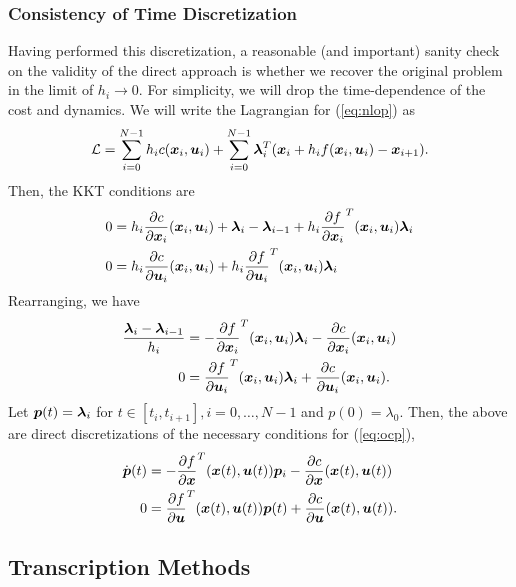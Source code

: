 \subsubsection{Consistency of Time Discretization}

Having performed this discretization, a reasonable (and important) sanity check on the validity of the direct approach is whether we recover the original problem in the limit of $h_i \to 0$. For simplicity, we will drop the time-dependence of the cost and dynamics. We will write the Lagrangian for (\ref{eq:nlop}) as 
\begin{equation}
    \mathcal{L} = \sum_{i=0}^{N-1} h_i c(\bm{x}_i,\bm{u}_i) + \sum_{i=0}^{N-1} \bm{\lambda}_i^T (\bm{x}_i + h_i f(\bm{x}_i,\bm{u}_i) - \bm{x}_{i+1}).
\end{equation}
Then, the KKT conditions are
\begin{align}
    0 &= h_i \frac{\partial c}{\partial \bm{x}_i}(\bm{x}_i,\bm{u}_i) + \bm{\lambda}_i - \bm{\lambda}_{i-1} + h_i \frac{\partial f}{\partial \bm{x}_i}^T(\bm{x}_i,\bm{u}_i) \bm{\lambda}_i\\
    0 &= h_i \frac{\partial c}{\partial \bm{u}_i}(\bm{x}_i,\bm{u}_i) + h_i \frac{\partial f}{\partial \bm{u}_i}^T(\bm{x}_i,\bm{u}_i) \bm{\lambda}_i
\end{align}
Rearranging, we have
\begin{align}
    \frac{\bm{\lambda}_i - \bm{\lambda}_{i-1}}{h_i} &=- \frac{\partial f}{\partial \bm{x}_i}^T(\bm{x}_i,\bm{u}_i) \bm{\lambda}_i- \frac{\partial c}{\partial \bm{x}_i}(\bm{x}_i,\bm{u}_i)\\
    0 &= \frac{\partial f}{\partial \bm{u}_i}^T(\bm{x}_i,\bm{u}_i) \bm{\lambda}_i + \frac{\partial c}{\partial \bm{u}_i}(\bm{x}_i,\bm{u}_i).
\end{align}
Let $\bm{p}(t) = \bm{\lambda}_i$ for $t \in [t_i, t_{i+1}], i = 0, \ldots, N-1$ and $p(0) = \lambda_0$. Then, the above are direct discretizations of the necessary conditions for (\ref{eq:ocp}), 
\begin{align}
    \dot{\bm{p}}(t) &=- \frac{\partial f}{\partial \bm{x}}^T(\bm{x}(t),\bm{u}(t)) \bm{p}_i- \frac{\partial c}{\partial \bm{x}}(\bm{x}(t),\bm{u}(t))\\
    0 &= \frac{\partial f}{\partial \bm{u}}^T(\bm{x}(t),\bm{u}(t)) \bm{p}(t) + \frac{\partial c}{\partial \bm{u}}(\bm{x}(t),\bm{u}(t)).
\end{align}

\subsection{Transcription Methods}

